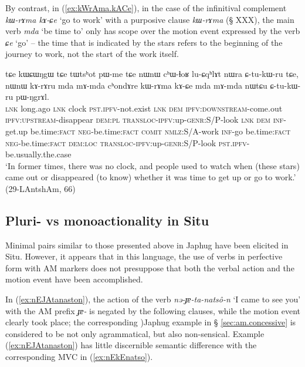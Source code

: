 \documentclass[oneside,a4paper,11pt]{article}
\newcommand{\ipa}[1]{{\phon\textit{#1}}}
\newcommand{\forme}[1]{\textit{\phon#1}}
\newcommand{\japhug}[2]{\textit{\phon#1} `#2'}
\begin{document}
By contrast, in  (\ref{ex:kWrAma.kACe}), in the case of the infinitival complement \forme{kɯ-rɤma kɤ-ɕe} `go to work' with a purposive clause \forme{kɯ-rɤma} (§ XXX), the main verb \japhug{mda}{be time to} only has scope over the motion event expressed by the verb \japhug{ɕe}{go} -- the time that is indicated by the stars refers to the beginning of the journey to work, not the start of the work itself.
 
 \begin{exe}
\ex \label{ex:kWrAma.kACe}
\gll  tɕe kɯɕɯŋgɯ tɕe tɯtsʰot pɯ-me tɕe  nɯnɯ cʰɯ-ɬoʁ lu-ɕqʰlɤt nɯra ɕ-tu-kɯ-ru tɕe, nɯnɯ kɤ-rɤru mda mɤ-mda cʰondɤre kɯ-rɤma kɤ-ɕe mda mɤ-mda nɯtɕu ɕ-tu-kɯ-ru pɯ-ŋgrɤl. \\
 \textsc{lnk} long.ago \textsc{lnk} clock \textsc{pst}.\textsc{ipfv}-not.exist \textsc{lnk} \textsc{dem} \textsc{ipfv}:\textsc{downstream}-come.out \textsc{ipfv}:\textsc{upstream}-disappear \textsc{dem}:\textsc{pl} \textsc{transloc}-\textsc{ipfv}:up-\textsc{genr}:S/P-look \textsc{lnk} \textsc{dem} \textsc{inf}-get.up be.time:\textsc{fact} \textsc{neg}-be.time:\textsc{fact} \textsc{comit} \textsc{nmlz}:S/A-work \textsc{inf}-go be.time:\textsc{fact} \textsc{neg}-be.time:\textsc{fact} \textsc{dem}:\textsc{loc} \textsc{transloc}-\textsc{ipfv}:up-\textsc{genr}:S/P-look \textsc{pst}.\textsc{ipfv}-be.usually.the.case  \\
 \glt  `In former times, there was no clock, and people used to watch when (these stars) came out or disappeared (to know) whether it was time to get up or go to work.' (29-LAntshAm, 66)
  \end{exe}
  
\subsection{Pluri- vs monoactionality in Situ} \label{sec:am.situ}
Minimal pairs similar to those presented above in Japhug have been elicited in Situ. However, it appears that in this language, the use of verbs in perfective form with AM markers does not presuppose that both the verbal action and the motion event have been accomplished. 


In (\ref{ex:nEJAtanaston}), the action of the verb \ipa{nə-ɟɐ-ta-natsô-n}  `I came to see you' with the AM prefix \ipa{ɟɐ-} is negated by the following clauses, while the motion event clearly took place; the corresponding )Japhug example in § \ref{sec:am.concessive} is considered to be not only agrammatical, but also non-sensical. Example (\ref{ex:nEJAtanaston}) has little discernible semantic difference with the corresponding MVC in (\ref{ex:nEkEnatso}).
 
\end{document}
